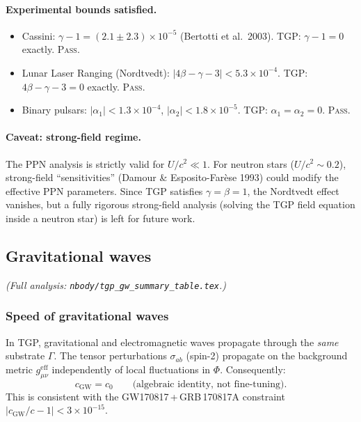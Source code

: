 \paragraph{Experimental bounds satisfied.}
\begin{itemize}[nosep]
  \item Cassini: $\gamma-1 = (2.1\pm 2.3)\times 10^{-5}$
        (Bertotti et al.\ 2003).
        TGP: $\gamma-1=0$ exactly.  \textsc{Pass.}
  \item Lunar Laser Ranging (Nordtvedt):
        $|4\beta-\gamma-3|<5.3\times 10^{-4}$.
        TGP: $4\beta-\gamma-3=0$ exactly.  \textsc{Pass.}
  \item Binary pulsars:
        $|\alpha_{1}|<1.3\times 10^{-4}$,
        $|\alpha_{2}|<1.8\times 10^{-5}$.
        TGP: $\alpha_{1}=\alpha_{2}=0$.  \textsc{Pass.}
\end{itemize}

\paragraph{Caveat: strong-field regime.}
The PPN analysis is strictly valid for $U/c^{2}\ll 1$.
For neutron stars ($U/c^{2}\sim 0.2$), strong-field
``sensitivities'' (Damour \& Esposito-Far\`ese 1993) could modify
the effective PPN parameters.  Since TGP satisfies $\gamma=\beta=1$,
the Nordtvedt effect vanishes, but a fully rigorous strong-field
analysis (solving the TGP field equation inside a neutron star)
is left for future work.

\subsection{Gravitational waves}\label{ssec:gw-summary}

\noindent\textit{(Full analysis: \texttt{nbody/tgp\_gw\_summary\_table.tex}.)}

\subsubsection{Speed of gravitational waves}

In TGP, gravitational and electromagnetic waves propagate through
the \emph{same} substrate $\Gamma$.  The tensor perturbations
$\sigma_{ab}$ (spin-2) propagate on the background metric
$g_{\mu\nu}^{\mathrm{eff}}$ independently of local fluctuations
in $\Phi$.  Consequently:
\begin{equation}\label{eq:cGW}
  \boxed{c_{\mathrm{GW}} = c_{0}}
  \qquad\text{(algebraic identity, not fine-tuning).}
\end{equation}
This is consistent with the GW170817\,+\,GRB\,170817A
constraint~\cite{GW170817,Baker2017}
$|c_{\mathrm{GW}}/c-1|<3\times 10^{-15}$.

